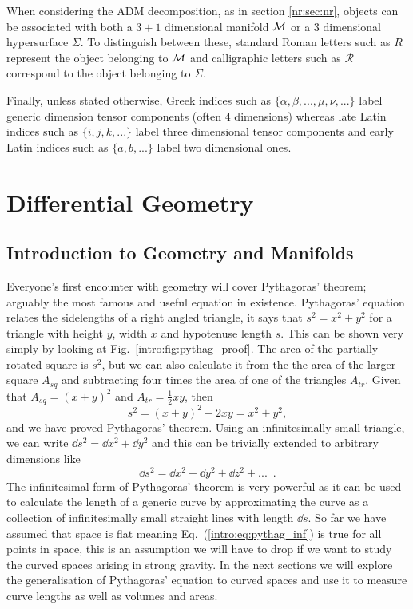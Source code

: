 When considering the ADM decomposition, as in section \ref{nr:sec:nr}, objects can be associated with both a $3+1$ dimensional manifold $\mathcal{M}$ or a $3$ dimensional hypersurface $\Sigma$. To distinguish between these, standard Roman letters such as $R$ represent the object belonging to $\mathcal{M}$ and calligraphic letters such as $\mathcal{R}$ correspond to the object belonging to $\Sigma$. 

Finally, unless stated otherwise, Greek indices such
as $\{\alpha, \beta, ..., \mu, \nu, ...\}$ label generic dimension tensor components (often 4 dimensions) whereas late Latin indices such as $\{i, j, k, ...\}$ label
three dimensional tensor components and early Latin indices such as $\{a, b, ...\}$ label two dimensional ones. 



\newpage
\section{Differential Geometry}
\subsection{Introduction to Geometry and Manifolds}





Everyone's first encounter with geometry will cover Pythagoras' theorem; arguably the most famous and useful equation in existence. Pythagoras' equation relates the sidelengths of a right angled triangle, it says that $s^2 = x^2 + y^2$ for a triangle with height $y$, width $x$ and hypotenuse length $s$. This can be shown very simply by looking at Fig.~\ref{intro:fig:pythag_proof}. The area of the partially rotated square is $s^2$, but we can also calculate it from the the area of the larger square $A_{sq}$ and subtracting four times the area of one of the triangles $A_{tr}$. Given that $A_{sq} = (x+y)^2$ and $A_{tr} = \frac{1}{2}xy$, then 
\begin{equation}
s^2 = (x+y)^2-2xy = x^2 + y^2,
\end{equation}
and we have proved Pythagoras' theorem. Using an infinitesimally small triangle, we can write $\dd s^2 = \dd x^2 + \dd y^2$ and this can be trivially extended to arbitrary dimensions like
\begin{equation}\label{intro:eq:pythag_inf}
\dd s^2 = \dd x^2 + \dd y^2 + \dd z^2 + ...\,\,\,.
\end{equation}
The infinitesimal form of Pythagoras' theorem is very powerful as it can be used to calculate the length of a generic curve by approximating the curve as a collection of infinitesimally small straight lines with length $\dd s$. So far we have assumed that space is flat meaning Eq.~(\ref{intro:eq:pythag_inf}) is true for all points in space, this is an assumption we will have to drop if we want to study the curved spaces arising in strong gravity. In the next sections we will explore the generalisation of Pythagoras' equation to curved spaces and use it to measure curve lengths as well as volumes and areas.

